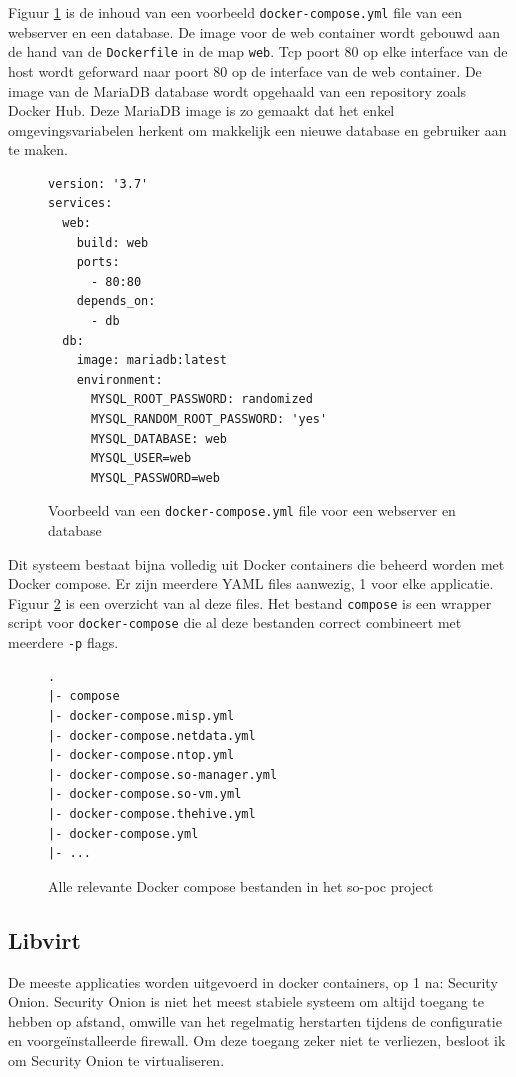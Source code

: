 \documentclass[a4paper,12pt]{report}
\begin{document}
Figuur \ref{fig:compose-web-example} is de inhoud van een voorbeeld \lstinline|docker-compose.yml| file van een webserver en een database.
De image voor de web container wordt gebouwd aan de hand van de \lstinline|Dockerfile| in de map \lstinline|web|.
Tcp poort 80 op elke interface van de host wordt geforward naar poort 80 op de interface van de web container.
De image van de MariaDB database wordt opgehaald van een repository zoals Docker Hub.
Deze MariaDB image is zo gemaakt dat het enkel omgevingsvariabelen herkent om makkelijk een nieuwe database en gebruiker aan te maken.

\begin{figure}[H]
  \begin{lstlisting}
version: '3.7'
services:
  web:
    build: web
    ports:
      - 80:80
    depends_on:
      - db
  db:
    image: mariadb:latest
    environment:
      MYSQL_ROOT_PASSWORD: randomized
      MYSQL_RANDOM_ROOT_PASSWORD: 'yes'
      MYSQL_DATABASE: web
      MYSQL_USER=web
      MYSQL_PASSWORD=web
  \end{lstlisting}
  \caption{Voorbeeld van een \lstinline|docker-compose.yml| file voor een webserver en database}
  \label{fig:compose-web-example}
\end{figure}

Dit systeem bestaat bijna volledig uit Docker containers die beheerd worden met Docker compose.
Er zijn meerdere YAML files aanwezig, 1 voor elke applicatie.
Figuur \ref{fig:compose-so-poc-files} is een overzicht van al deze files.
Het bestand \lstinline|compose| is een wrapper script voor \lstinline{docker-compose} die al deze bestanden correct combineert met meerdere \lstinline|-p| flags.

\begin{figure}[H]
  \begin{lstlisting}
.
|- compose
|- docker-compose.misp.yml
|- docker-compose.netdata.yml
|- docker-compose.ntop.yml
|- docker-compose.so-manager.yml
|- docker-compose.so-vm.yml
|- docker-compose.thehive.yml
|- docker-compose.yml
|- ...
  \end{lstlisting}
  \caption{Alle relevante Docker compose bestanden in het so-poc project}
  \label{fig:compose-so-poc-files}
\end{figure}

\subsection{Libvirt}
De meeste applicaties worden uitgevoerd in docker containers, op 1 na: Security Onion.
Security Onion is niet het meest stabiele systeem om altijd toegang te hebben op afstand, omwille van het regelmatig herstarten tijdens de configuratie en voorgeïnstalleerde firewall.
Om deze toegang zeker niet te verliezen, besloot ik om Security Onion te virtualiseren.
\end{document}

